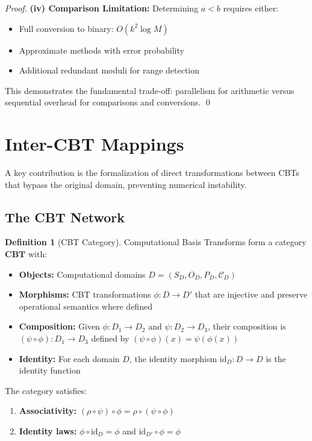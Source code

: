 \documentclass[11pt]{article}
\theoremstyle{definition}
\newtheorem{definition}{Definition}
\begin{document}
\begin{proof}
\textbf{(iv) Comparison Limitation:} Determining $a < b$ requires either:
\begin{itemize}
\item Full conversion to binary: $O(k^2 \log M)$
\item Approximate methods with error probability
\item Additional redundant moduli for range detection
\end{itemize}

This demonstrates the fundamental trade-off: parallelism for arithmetic versus sequential overhead for comparisons and conversions. \qed
\end{proof}


\section{Inter-CBT Mappings}
\label{sec:mappings}

A key contribution is the formalization of direct transformations between CBTs that bypass the original domain, preventing numerical instability.

\subsection{The CBT Network}

\begin{definition}[CBT Category]
\label{def:cbt-category}
Computational Basis Transforms form a category $\mathbf{CBT}$ with:
\begin{itemize}
\item \textbf{Objects:} Computational domains $D = (S_D, O_D, P_D, \mathcal{C}_D)$
\item \textbf{Morphisms:} CBT transformations $\phi: D \to D'$ that are injective and preserve operational semantics where defined
\item \textbf{Composition:} Given $\phi: D_1 \to D_2$ and $\psi: D_2 \to D_3$, their composition is $(\psi \circ \phi): D_1 \to D_3$ defined by $(\psi \circ \phi)(x) = \psi(\phi(x))$
\item \textbf{Identity:} For each domain $D$, the identity morphism $\mathrm{id}_D: D \to D$ is the identity function
\end{itemize}
The category satisfies:
\begin{enumerate}
\item \textbf{Associativity:} $(\rho \circ \psi) \circ \phi = \rho \circ (\psi \circ \phi)$
\item \textbf{Identity laws:} $\phi \circ \mathrm{id}_D = \phi$ and $\mathrm{id}_{D'} \circ \phi = \phi$
\end{enumerate}
\end{definition}
\end{document}
